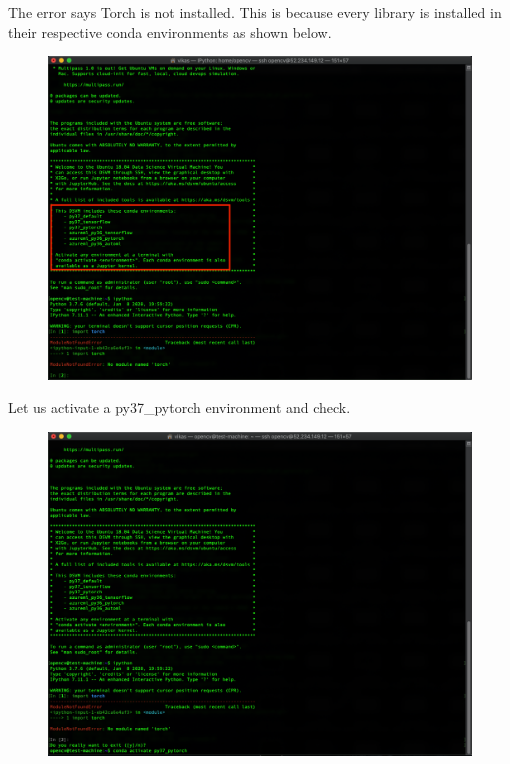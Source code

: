 The error says Torch is not installed. This is because every library is installed in their respective conda environments as shown below.

\begin{figure}[H]
\begin{center} 
\includegraphics[scale=0.30]{figures/ssh9}
\end{center}
\end{figure}

Let us activate a py37\_pytorch environment and check.

\begin{figure}[H]
\begin{center} 
\includegraphics[scale=0.30]{figures/ssh10}
\end{center}
\end{figure}

